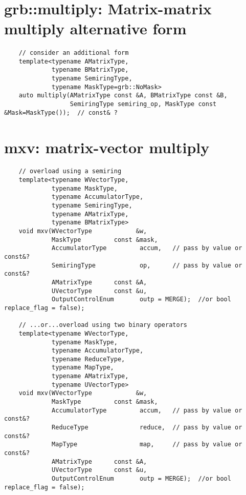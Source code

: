 \section{{\sf grb::multiply}: Matrix-matrix multiply alternative form}

\paragraph{\syntax}

\begin{verbatim}
    // consider an additional form
    template<typename AMatrixType,
             typename BMatrixType,
             typename SemiringType,
             typename MaskType=grb::NoMask>
    auto multiply(AMatrixType const &A, BMatrixType const &B,
                  SemiringType semiring_op, MaskType const &Mask=MaskType());  // const& ?
\end{verbatim}

\section{{\sf mxv}: matrix-vector multiply}

\paragraph{\syntax}

\begin{verbatim}
    // overload using a semiring
    template<typename WVectorType,
             typename MaskType,
             typename AccumulatorType,
             typename SemiringType,
             typename AMatrixType,
             typename BMatrixType>
    void mxv(WVectorType            &w,
             MaskType         const &mask,
             AccumulatorType         accum,   // pass by value or const&?
             SemiringType            op,      // pass by value or const&?
             AMatrixType      const &A,
             UVectorType      const &u,
             OutputControlEnum       outp = MERGE);  //or bool replace_flag = false);

    // ...or...overload using two binary operators
    template<typename WVectorType,
             typename MaskType,
             typename AccumulatorType,
             typename ReduceType,
             typename MapType,
             typename AMatrixType,
             typename UVectorType>
    void mxv(WVectorType            &w,
             MaskType         const &mask,
             AccumulatorType         accum,   // pass by value or const&?
             ReduceType              reduce,  // pass by value or const&?
             MapType                 map,     // pass by value or const&?
             AMatrixType      const &A,
             UVectorType      const &u,
             OutputControlEnum       outp = MERGE);  //or bool replace_flag = false);
\end{verbatim}

